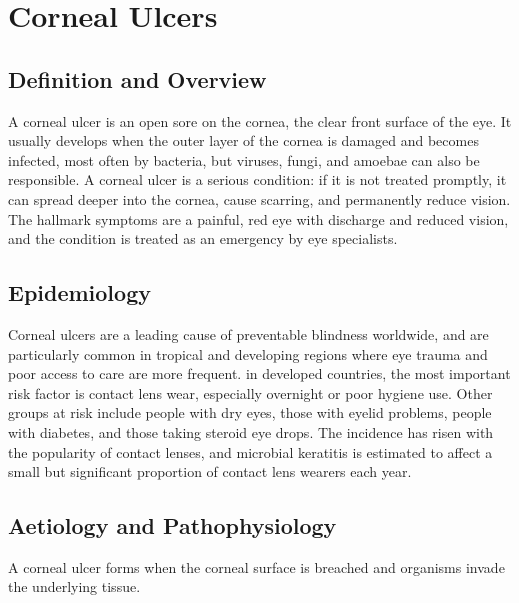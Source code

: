 \chapter{Corneal Ulcers}

\section*{Definition and Overview}
A corneal ulcer is an open sore on the cornea, the clear front surface of the eye. It usually develops when the outer layer of the cornea is damaged and becomes infected, most often by bacteria, but viruses, fungi, and amoebae can also be responsible. A corneal ulcer is a serious condition: if it is not treated promptly, it can spread deeper into the cornea, cause scarring, and permanently reduce vision. The hallmark symptoms are a painful, red eye with discharge and reduced vision, and the condition is treated as an emergency by eye specialists.

\section*{Epidemiology}
Corneal ulcers are a leading cause of preventable blindness worldwide, and are particularly common in tropical and developing regions where eye trauma and poor access to care are more frequent. in developed countries, the most important risk factor is contact lens wear, especially overnight or poor hygiene use. Other groups at risk include people with dry eyes, those with eyelid problems, people with diabetes, and those taking steroid eye drops. The incidence has risen with the popularity of contact lenses, and microbial keratitis is estimated to affect a small but significant proportion of contact lens wearers each year.

\section*{Aetiology and Pathophysiology}
A corneal ulcer forms when the corneal surface is breached and organisms invade the underlying tissue.

